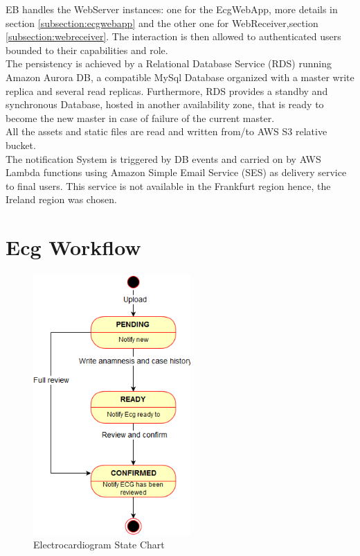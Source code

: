EB handles the WebServer instances: one for the EcgWebApp, more details in section \ref{subsection:ecgwebapp} and the other one for WebReceiver,section \ref{subsection:webreceiver}. The interaction is then allowed to authenticated users bounded to their capabilities and role.\\
The persistency is achieved by a Relational Database Service (RDS) running Amazon Aurora DB, a compatible MySql Database organized with a master write replica and several read replicas.
Furthermore, RDS provides a standby and synchronous Database, hosted in another availability zone, that is ready to become the new master in case of failure of the current master.\\
All the assets and static files are read and written from/to AWS S3 relative bucket.\\
The notification System is triggered by DB events and carried on by AWS Lambda functions using Amazon Simple Email Service (SES) as delivery service to final users. This service is not available in the Frankfurt region hence, the Ireland region was chosen.


\section{Ecg Workflow}
\begin{figure}[h] %
    \centering
    \includegraphics[width=6cm]{img/ECGstatechart}
    \caption{Electrocardiogram State Chart}
    \label{fig:ECGstatechart}
\end{figure}
 
